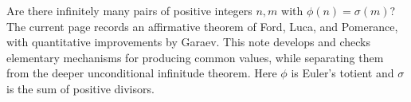 Are there infinitely many pairs of positive integers $n,m$ with $\phi(n)=\sigma(m)$? The current page records an affirmative theorem of Ford, Luca, and Pomerance, with quantitative improvements by Garaev. This note develops and checks elementary mechanisms for producing common values, while separating them from the deeper unconditional infinitude theorem. Here $\phi$ is Euler's totient and $\sigma$ is the sum of positive divisors.
